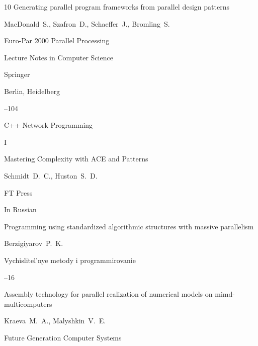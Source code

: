 \begin{thebibliography}{10}
\paper Generating parallel program frame\-works from parallel design patterns

\by MacDonald~S., Szafron~D., Schaeffer~J., Bromling~S.

\inbook  Euro-Par 2000 Parallel Processing


\serial Lecture Notes in Computer Science

\publ Springer 

\publaddr Berlin, Heidelberg


--104









\book C++ Network Programming

\bookvol I

\volinfo Mastering   Complexity with ACE and Patterns

\by Schmidt~D.~C., Huston~S.~D. 

\publ FT Press







\lang In Russian

\paper Programming using standardized algorithmic structures with massive parallelism

\by Berzigiyarov~P.~K. 

\jour Vychislitel'nye metody i programmirovanie




--16




\paper Assembly technology for parallel realization of   numerical models on mimd-multicomputers

\by Kraeva~M.~A., Malyshkin~V.~E.

\jour Future Generation Computer Systems




\end{thebibliography}
